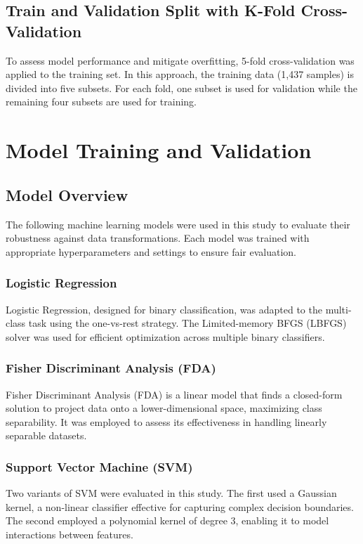 \documentclass{article}
\begin{document}
\subsection{Train and Validation Split with K-Fold Cross-Validation}
To assess model performance and mitigate overfitting, 5-fold cross-validation was applied to the training set. 
In this approach, the training data (1,437 samples) is divided into five subsets. 
For each fold, one subset is used for validation while the remaining four subsets are used for training. 

\section{Model Training and Validation}

\subsection{Model Overview}
The following machine learning models were used in this study to evaluate their robustness against data transformations.
Each model was trained with appropriate hyperparameters and settings to ensure fair evaluation.

\subsubsection{Logistic Regression}
Logistic Regression, designed for binary classification, was adapted to the multi-class task using the one-vs-rest strategy. 
The Limited-memory BFGS (LBFGS) solver was used for efficient optimization across multiple binary classifiers.

\subsubsection{Fisher Discriminant Analysis (FDA)}
Fisher Discriminant Analysis (FDA) is a linear model that finds a closed-form solution to project data onto a lower-dimensional space, maximizing class separability. 
It was employed to assess its effectiveness in handling linearly separable datasets.

\subsubsection{Support Vector Machine (SVM)}
Two variants of SVM were evaluated in this study. The first used a Gaussian kernel, a non-linear classifier effective for capturing complex decision boundaries. 
The second employed a polynomial kernel of degree 3, enabling it to model interactions between features.
\end{document}
